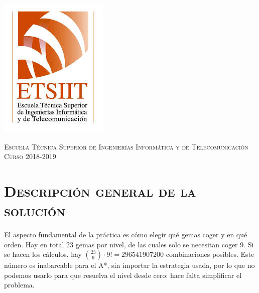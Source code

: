 \documentclass[11pt,a4paper]{article}
\begin{document}
\begin{titlepage}
\begin{minipage}{\textwidth}
\includegraphics[scale=0.3]{img/etsiit.jpeg}

\vspace{0.7cm}
\textsc{Escuela Técnica Superior de Ingenierías Informática y de Telecomunicación}\\
\vspace{1cm}
\textsc{Curso 2018-2019}
\end{minipage}
\end{titlepage}

\tableofcontents
\thispagestyle{empty}				%

\newpage

\setlength{\parskip}{1em}

\section{\textsc{Descripción general de la solución}}

El aspecto fundamental de la práctica es cómo elegir qué gemas coger y en qué orden. Hay en total 23
gemas por nivel, de las cuales solo se necesitan coger 9. Si se hacen los cálculos, hay
${23\choose 9} \cdot 9! = 296541907200$ combinaciones posibles. Este número es inabarcable para el
A*, sin importar la estrategia usada, por lo que no podemos usarlo para que resuelva el nivel desde
cero: hace falta simplificar el problema.
\end{document}

